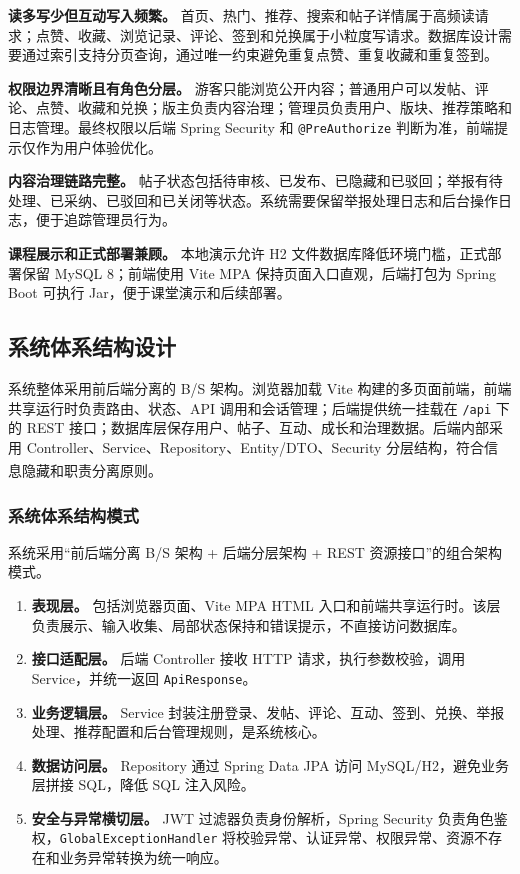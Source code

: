 \documentclass[UTF8,zihao=-4,a4paper]{ctexart}
\newcommand{\citeup}[1]{\textsuperscript{\fontsize{12pt}{20pt}\selectfont\rmfamily[#1]}}
\newcommand{\term}[1]{\textbf{#1}}
\begin{document}
\term{读多写少但互动写入频繁。} 首页、热门、推荐、搜索和帖子详情属于高频读请求；点赞、收藏、浏览记录、评论、签到和兑换属于小粒度写请求。数据库设计需要通过索引支持分页查询，通过唯一约束避免重复点赞、重复收藏和重复签到。

\term{权限边界清晰且有角色分层。} 游客只能浏览公开内容；普通用户可以发帖、评论、点赞、收藏和兑换；版主负责内容治理；管理员负责用户、版块、推荐策略和日志管理。最终权限以后端 Spring Security 和 \texttt{@PreAuthorize} 判断为准，前端提示仅作为用户体验优化。

\term{内容治理链路完整。} 帖子状态包括待审核、已发布、已隐藏和已驳回；举报有待处理、已采纳、已驳回和已关闭等状态。系统需要保留举报处理日志和后台操作日志，便于追踪管理员行为。

\term{课程展示和正式部署兼顾。} 本地演示允许 H2 文件数据库降低环境门槛，正式部署保留 MySQL 8；前端使用 Vite MPA 保持页面入口直观，后端打包为 Spring Boot 可执行 Jar，便于课堂演示和后续部署。

\subsection{系统体系结构设计}

系统整体采用前后端分离的 B/S 架构。浏览器加载 Vite 构建的多页面前端，前端共享运行时负责路由、状态、API 调用和会话管理；后端提供统一挂载在 \texttt{/api} 下的 REST 接口；数据库层保存用户、帖子、互动、成长和治理数据。后端内部采用 Controller、Service、Repository、Entity/DTO、Security 分层结构，符合信息隐藏和职责分离原则\citeup{2,4,9}。

\subsubsection{系统体系结构模式}

系统采用“前后端分离 B/S 架构 + 后端分层架构 + REST 资源接口”的组合架构模式。

\begin{enumerate}
\item \term{表现层。} 包括浏览器页面、Vite MPA HTML 入口和前端共享运行时。该层负责展示、输入收集、局部状态保持和错误提示，不直接访问数据库。
\item \term{接口适配层。} 后端 Controller 接收 HTTP 请求，执行参数校验，调用 Service，并统一返回 \texttt{ApiResponse}。
\item \term{业务逻辑层。} Service 封装注册登录、发帖、评论、互动、签到、兑换、举报处理、推荐配置和后台管理规则，是系统核心。
\item \term{数据访问层。} Repository 通过 Spring Data JPA 访问 MySQL/H2，避免业务层拼接 SQL，降低 SQL 注入风险。
\item \term{安全与异常横切层。} JWT 过滤器负责身份解析，Spring Security 负责角色鉴权，\texttt{GlobalExceptionHandler} 将校验异常、认证异常、权限异常、资源不存在和业务异常转换为统一响应。
\end{enumerate}
\end{document}
